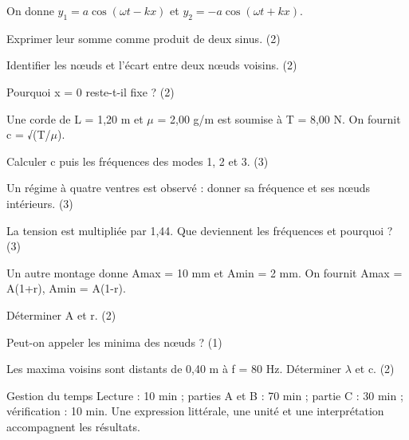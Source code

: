 On donne $y_1=a\cos(\omega t-kx)$ et $y_2=-a\cos(\omega t+kx)$.\begin{questions}
\item Exprimer leur somme comme produit de deux sinus. (2)
\item Identifier les nœuds et l’écart entre deux nœuds voisins. (2)
\item Pourquoi x = 0 reste-t-il fixe ? (2)
\end{questions}

Une corde de L = 1,20 m et \ensuremath{\mu} = 2,00 g/m est soumise à T = 8,00 N. On fournit c = √(T/\ensuremath{\mu}).\begin{questions}
\item Calculer c puis les fréquences des modes 1, 2 et 3. (3)
\item Un régime à quatre ventres est observé : donner sa fréquence et ses nœuds intérieurs. (3)
\item La tension est multipliée par 1,44. Que deviennent les fréquences et pourquoi ? (3)
\end{questions}



Un autre montage donne Amax = 10 mm et Amin = 2 mm. On fournit Amax = A(1+r), Amin = A(1-r).\begin{questions}
\item Déterminer A et r. (2)
\item Peut-on appeler les minima des nœuds ? (1)
\item Les maxima voisins sont distants de 0,40 m à f = 80 Hz. Déterminer \ensuremath{\lambda} et c. (2)
\end{questions}

\begin{docu}{Gestion du temps}
Lecture : 10 min ; parties A et B : 70 min ; partie C : 30 min ; vérification : 10 min. Une expression littérale, une unité et une interprétation accompagnent les résultats.
\end{docu}


